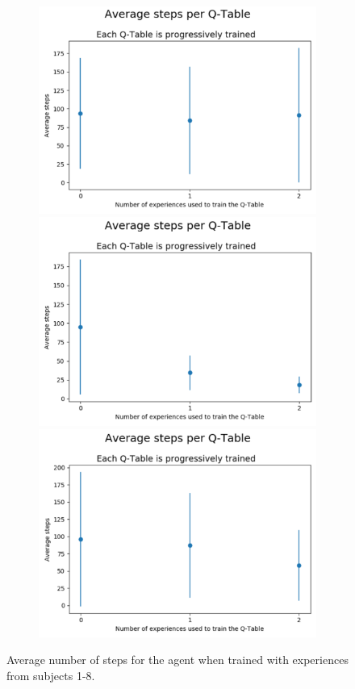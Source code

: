 \documentclass[journal]{IEEEtran}
\begin{document}
{{\begin{figure}[h!]
\begin{subfigure}{0.5\textwidth}
  \includegraphics[scale=0.2]{Images/Average_steps/marta.png} 
  \includegraphics[scale=0.2]{Images/Average_steps/nati.png} 
  \includegraphics[scale=0.2]{Images/Average_steps/santiago.png} 
\end{subfigure}
\caption{Average number of steps for the agent when trained with experiences from subjects 1-8.}
\label{fig:avg_steps}
\end{figure}


}}
\end{document}
